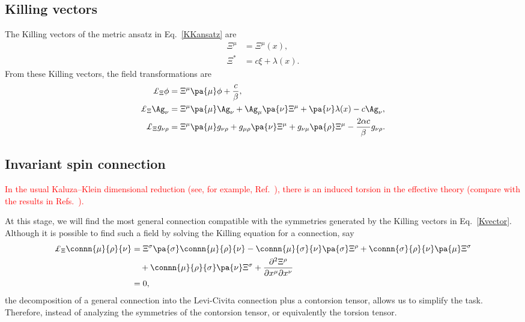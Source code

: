 \documentclass[aps,prd,12pt,superscriptaddress,showpacs,showkeys,reprint]{revtex4-1}
\begin{document}
\subsection*{Killing vectors}

The Killing vectors of the metric ansatz in Eq.~\eqref{KKansatz} are 
\begin{equation}
  \begin{split}
    \Xi^\mu &= \Xi^\mu(x), \\
    \Xi^*  &= c \xi + \lambda(x).
  \end{split}
  \label{Kvector}
\end{equation}
From these Killing vectors, the field transformations are
\begin{align}
  \label{Liephi}
  \pounds_\Xi \phi    &= \Xi^\mu \pa{\mu} \phi + \frac{c}{\beta}, \\
  \label{LieA}
  \pounds_\Xi \Ag_\nu  &= \Xi^\mu \pa{\mu} \Ag_\nu + \Ag_\mu \pa{\nu} \Xi^\mu + \pa{\nu} \lambda(x) - c \Ag_\nu, \\
  \label{Lieg}
  \pounds_\Xi g_{\nu\rho} &= \Xi^\mu \pa{\mu} g_{\nu\rho} + g_{\mu\rho} \pa{\nu} \Xi^\mu + g_{\nu\mu} \pa{\rho} \Xi^\mu - \frac{2\alpha c}{\beta} g_{\nu\rho}.
\end{align}


\subsection*{Invariant spin connection}

\textcolor{red}{In the usual Kaluza--Klein dimensional reduction (see, for example, Ref.~\cite{PopeKK}), there is an induced torsion in the effective theory (compare with the results in Refs.~\cite{PhysRevD.17.3141,PhysRevD.19.430}).}

At this stage, we will find the most general connection compatible with the symmetries generated by the Killing vectors in Eq.~\eqref{Kvector}. Although it is possible to find such a field by solving the Killing equation for a connection, say~\cite{Tilquin:2011bu}
\begin{equation}
  \begin{split}
    \pounds_\Xi \connn{\mu}{\rho}{\nu} &= \Xi^\sigma \pa{\sigma} \connn{\mu}{\rho}{\nu} - \connn{\mu}{\sigma}{\nu} \pa{\sigma} \Xi^\rho + \connn{\sigma}{\rho}{\nu} \pa{\mu} \Xi^\sigma \\
    & \quad + \connn{\mu}{\rho}{\sigma} \pa{\nu} \Xi^\sigma + \frac{ \partial^2 \Xi^\rho }{ \partial x^\mu \partial x^\nu} \\
    &= 0,
  \end{split}
\end{equation}
the decomposition of a general connection into the Levi-Civita connection plus a contorsion tensor, allows us to simplify the task. Therefore, instead of analyzing the symmetries of the contorsion tensor, or equivalently the torsion tensor.
\end{document}

